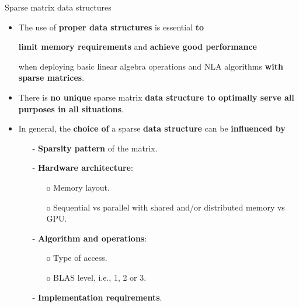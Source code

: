 \documentclass[t,usepdftitle=false]{beamer}
\begin{document}
\begin{frame}{Sparse matrix data structures}
\begin{itemize}
\item The use of \textbf{proper data structures} is essential \textbf{to}
\begin{center}\textbf{limit memory requirements} and \textbf{achieve good performance}\end{center}
when deploying basic linear algebra operations and NLA algorithms \textbf{with sparse matrices}.
\item There is \textbf{no unique} sparse matrix \textbf{data structure to optimally serve all purposes in all situations}.
\item In general, the \textbf{choice of} a sparse \textbf{data structure} can be \textbf{influenced by}
\begin{itemize}\normalsize
\item[-] \textbf{Sparsity pattern} of the matrix.\vspace{.15cm}
\item[-] \textbf{Hardware architecture}:
\begin{itemize}\normalsize
\item[o] Memory layout.
\item[o] Sequential vs parallel with shared and/or distributed memory vs GPU.\vspace{.1cm}
\end{itemize}
\item[-] \textbf{Algorithm and operations}:
\begin{itemize}\normalsize
\item[o] Type of access.
\item[o] BLAS level, i.e., 1, 2 or 3.
\end{itemize}
\item[-] \textbf{Implementation requirements}.
\end{itemize}
\end{itemize}
\end{frame}
\end{document}
